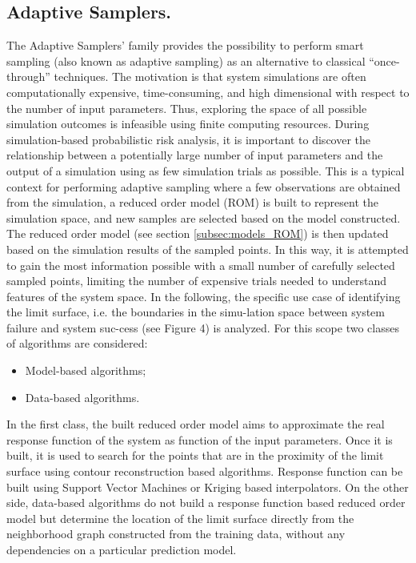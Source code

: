 \subsection{Adaptive Samplers.}
\label{subsec:AdaptSamplers}
The Adaptive Samplers' family provides the possibility to perform smart sampling (also known as adaptive sampling) as an alternative to classical “once-through” techniques.
The motivation is that system simulations are often computationally expensive, time-consuming, and high dimensional with respect to the number of input parameters. Thus, exploring the space of all possible simulation outcomes is infeasible using finite computing resources. During simulation-based probabilistic risk analysis, it is important to discover the relationship between a potentially large number of input parameters and the output of a simulation using as few simulation trials as possible.
This is a typical context for performing adaptive sampling where a few observations are obtained from the simulation, a reduced order model (ROM) is built to represent the simulation space, and new samples are selected based on the model constructed. The reduced order model (see section \ref{subsec:models_ROM}) is then updated based on the simulation results of the sampled points. In this way, it is attempted to gain the most information possible with a small number of carefully selected sampled points, limiting the number of expensive trials needed to understand features of the system space.
In the following, the specific use case of identifying the limit surface, i.e. the boundaries in the simu-lation space between system failure and system suc-cess (see Figure 4) is analyzed.
For this scope two classes of algorithms are considered:
\begin{itemize}
\item Model-based algorithms;
\item Data-based algorithms.
\end{itemize}
In the first class, the built reduced order model aims to approximate the real response function of the system as function of the input parameters. Once it is built, it is used to search for the points that are in the proximity of the limit surface using contour reconstruction based algorithms. Response function can be built using Support Vector Machines or Kriging based interpolators.
On the other side, data-based algorithms do not build a response function based reduced order model but determine the location of the limit surface directly from the neighborhood graph constructed from the training data, without any dependencies on a particular prediction model.
